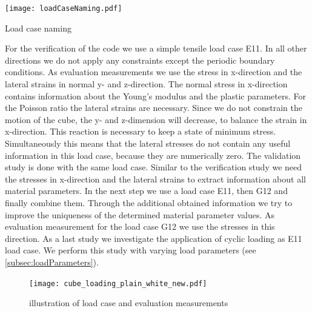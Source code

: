     \begin{table}[H]
        \centering
        \texttt{[image: loadCaseNaming.pdf]}
		\caption{Load case naming}
		\label{tab:loadCaseNaming}
    \end{table}

    For the verification of the code we use a simple tensile load case E11.
    In all other directions we do not apply any constraints except the periodic boundary conditions. As evaluation measurements we use the stress in x-direction and the lateral strains in normal y- and z-direction. The normal stress in x-direction contains information about the Young's modulus and the plastic parameters. For the Poisson ratio the lateral strains are necessary. Since we do not constrain the motion of the cube, the y- and z-dimension will decrease, to balance the strain in x-direction. This reaction is necessary to keep a state of minimum stress. Simultaneously this means that the lateral stresses do not contain any useful information in this load case, because they are numerically zero. 
    The validation study is done with the same load case. Similar to the verification study we need the stresses in x-direction and the lateral strains to extract information about all material parameters. 
    In the next step we use a load case E11, then G12 and finally combine them. Through the additional obtained information we try to improve the uniqueness of the determined material parameter values. As evaluation measurement for the load case G12 we use the stresses in this direction.
    As a last study we investigate the application of cyclic loading as E11 load case. We perform this study with varying load parameters (see \autoref{subsec:loadParameters}). 


    \begin{figure}
		\centering
        \texttt{[image: cube\_loading\_plain\_white\_new.pdf]}
		\caption{illustration of load case and evaluation measurements}
		\label{fig:loadCaseEvaluationMeasurements}
	\end{figure}

